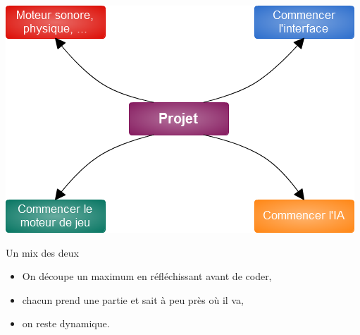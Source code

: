\begin{frame}
  \begin{center}
    \includegraphics[scale=0.5]{images/slide2.png}
  \end{center}
\end{frame}

\begin{frame}
  \begin{block}{Un mix des deux}
    \begin{itemize}
      \item On découpe un maximum en réfléchissant avant de coder,
      \item chacun prend une partie et sait à peu près où il va,
      \item on reste dynamique.
    \end{itemize}
  \end{block}
\end{frame}
